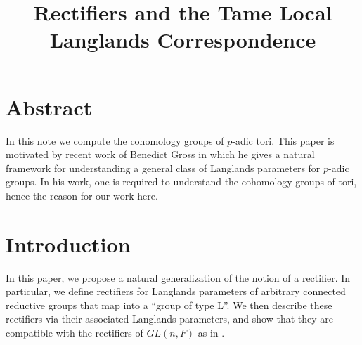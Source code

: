 \documentclass[11pt]{amsart}
\theoremstyle{plain}
\begin{document}
\title{Rectifiers and the Tame Local Langlands Correspondence}





\maketitle

\section{Abstract}

In this note we compute the cohomology groups of $p$-adic tori.  This paper is motivated by recent work of Benedict Gross in which he gives a natural framework for understanding a general class of Langlands parameters for $p$-adic groups.  In his work, one is required to understand the cohomology groups of tori, hence the reason for our work here.

\section{Introduction}
In this paper, we propose a natural generalization of the notion of a rectifier.  In particular, we define rectifiers for Langlands parameters of arbitrary connected reductive groups that map into a ``group of type L''.
We then describe these rectifiers via their associated Langlands parameters, and show that they are compatible with the rectifiers of $GL(n,F)$ as in \cite{bushnellhenniart}.
\end{document}
